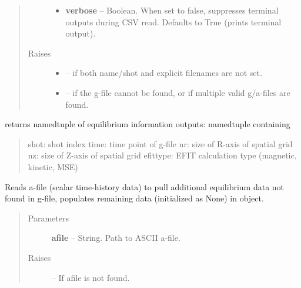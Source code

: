 \documentclass[letterpaper,10pt,english]{sphinxmanual}
\begin{document}
\begin{fulllineitems}
\begin{quote}
\begin{description}
\begin{itemize}
\item {} 
\textbf{verbose} --
Boolean.  When set to false, suppresses terminal outputs during CSV read.
Defaults to True (prints terminal output).

\end{itemize}

\item[{Raises }] \leavevmode\begin{itemize}
\item {} 
 -- 
if both name/shot and explicit filenames are not set.

\item {} 
 -- 
if the g-file cannot be found, or if multiple valid g/a-files are found.

\end{itemize}

\end{description}\end{quote}

\begin{fulllineitems}
\label{eqtools:eqtools.eqdskreader.EqdskReader.getInfo}
returns namedtuple of equilibrium information
outputs:
namedtuple containing
\begin{quote}

shot:       shot index
time:       time point of g-file
nr:         size of R-axis of spatial grid
nz:         size of Z-axis of spatial grid
efittype:   EFIT calculation type (magnetic, kinetic, MSE)
\end{quote}

\end{fulllineitems}


\begin{fulllineitems}
\label{eqtools:eqtools.eqdskreader.EqdskReader.readAFile}
Reads a-file (scalar time-history data) to pull additional equilibrium data
not found in g-file, populates remaining data (initialized as None) in object.
\begin{quote}\begin{description}
\item[{Parameters }] \leavevmode
\textbf{afile} --
String.  Path to ASCII a-file.

\item[{Raises }] \leavevmode
{} -- 
If afile is not found.


\end{description}
\end{quote}
\end{fulllineitems}
\end{fulllineitems}
\end{document}
